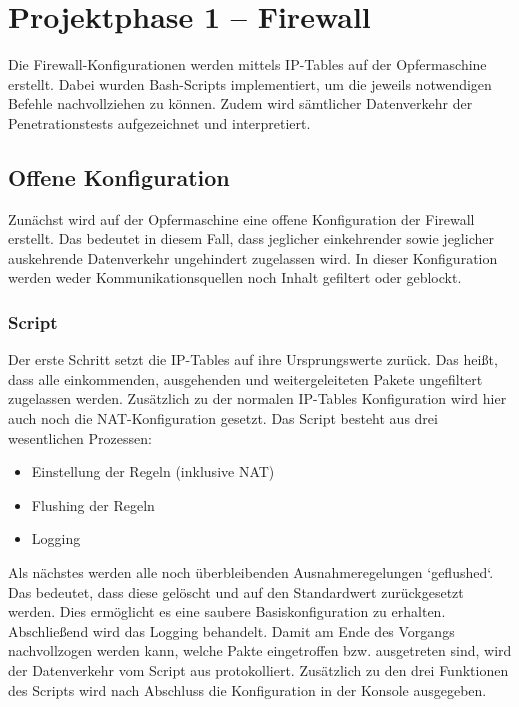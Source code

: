 \chapter{Projektphase 1 – Firewall}
Die Firewall-Konfigurationen werden mittels IP-Tables auf der Opfermaschine erstellt. Dabei wurden Bash-Scripts implementiert, um die jeweils notwendigen Befehle nachvollziehen zu können. Zudem wird sämtlicher Datenverkehr der Penetrationstests aufgezeichnet und interpretiert. 
\section{Offene Konfiguration}

Zunächst wird auf der Opfermaschine eine offene Konfiguration der Firewall erstellt. Das bedeutet in diesem Fall, dass jeglicher einkehrender sowie jeglicher auskehrende Datenverkehr ungehindert zugelassen wird. In dieser Konfiguration werden weder Kommunikationsquellen noch Inhalt gefiltert oder geblockt.

\subsection{Script}
Der erste Schritt setzt die IP-Tables auf ihre Ursprungswerte zurück. Das heißt, dass alle einkommenden, ausgehenden und weitergeleiteten Pakete ungefiltert zugelassen werden. Zusätzlich zu der normalen IP-Tables Konfiguration wird hier auch noch die NAT-Konfiguration gesetzt.  
Das Script besteht aus drei wesentlichen Prozessen: 
\begin{itemize}
	\item Einstellung der Regeln (inklusive NAT)
	\item Flushing der Regeln
	\item Logging
\end{itemize} 

Als nächstes werden alle noch überbleibenden Ausnahmeregelungen `geflushed`. Das bedeutet, dass diese gelöscht und auf den Standardwert zurückgesetzt werden. Dies ermöglicht es eine saubere Basiskonfiguration zu erhalten.\\
Abschließend wird das Logging behandelt. Damit am Ende des Vorgangs nachvollzogen werden kann, welche Pakte eingetroffen bzw. ausgetreten sind, wird der Datenverkehr vom Script aus protokolliert.
Zusätzlich zu den drei Funktionen des Scripts wird nach Abschluss die Konfiguration in der Konsole ausgegeben.

\newpage

